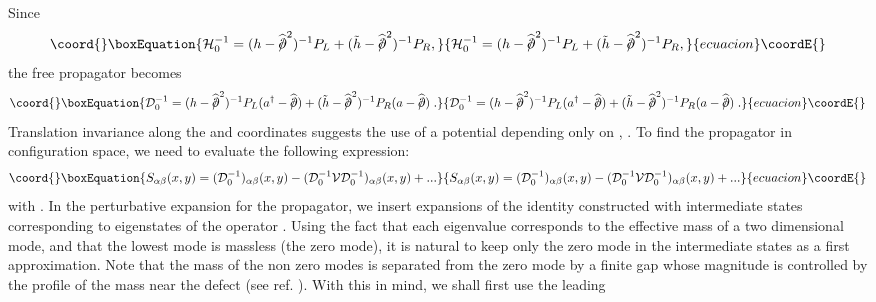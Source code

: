 \documentclass[a4paper,12pt]{article}
\begin{document}
{{Since
\begin{equation}\coord{}\boxEquation{
{\mathcal H}_0 ^{-1}=
(h - \widehat{/\!\!\!\partial}^2)^{-1} P_L + (\tilde{h} - \widehat{/\!\!\!\partial}^2)^{-1} P_R ,
}{
{\mathcal H}_0 ^{-1}=
(h - \widehat{/\!\!\!\partial}^2)^{-1} P_L + (\tilde{h} - \widehat{/\!\!\!\partial}^2)^{-1} P_R ,
}{ecuacion}\coordE{}\end{equation}
the free propagator becomes
\begin{equation}\coord{}\boxEquation{
   \label{Ddeop}
{\mathcal D}_0 ^{-1}= (h - \widehat{/\!\!\!\partial}^2)^{-1} P_L
(a^{\dagger} - \widehat{/\!\!\!\partial}) + (\tilde{h} -
\widehat{/\!\!\!\partial}^2)^{-1} P_R (a - \widehat{/\!\!\!\partial}) \;.
}{
   {\mathcal D}_0 ^{-1}= (h - \widehat{/\!\!\!\partial}^2)^{-1} P_L
(a^{\dagger} - \widehat{/\!\!\!\partial}) + (\tilde{h} -
\widehat{/\!\!\!\partial}^2)^{-1} P_R (a - \widehat{/\!\!\!\partial}) \;.
}{ecuacion}\coordE{}\end{equation}
Translation invariance along the \coordHE{} and \coordHE{} coordinates suggests
the use of a potential depending only on \coordHE{}, \coordHE{}.  To find the propagator in configuration
space, we need to evaluate the following expression:
\begin{equation}\coord{}\boxEquation{
S_{\alpha\beta}(x,y)=({\mathcal D}_0 ^{-1})_{\alpha\beta}(x,y)-({\mathcal D}_0 ^{-1}{\mathcal V}
{\mathcal D}_0 ^{-1})_{\alpha\beta}(x,y) + ...
}{
S_{\alpha\beta}(x,y)=({\mathcal D}_0 ^{-1})_{\alpha\beta}(x,y)-({\mathcal D}_0 ^{-1}{\mathcal V}
{\mathcal D}_0 ^{-1})_{\alpha\beta}(x,y) + ...
}{ecuacion}\coordE{}\end{equation}
with \coordHE{}. In the perturbative expansion
for the propagator, we insert expansions of the identity constructed
with intermediate states corresponding to eigenstates of the operator
\coordHE{}. Using the fact that each eigenvalue \coordHE{}
corresponds to the effective mass of a two dimensional mode, and that
the lowest mode is massless (the zero mode), it is natural to keep
only the zero mode in the intermediate states as a first
approximation. Note that the mass \coordHE{} of the non zero modes is
separated from the zero mode by a finite gap whose magnitude is
controlled by the profile of the mass near the defect (see ref.
\cite{p1}). With this in mind, we shall first use the leading
}}
\end{document}
